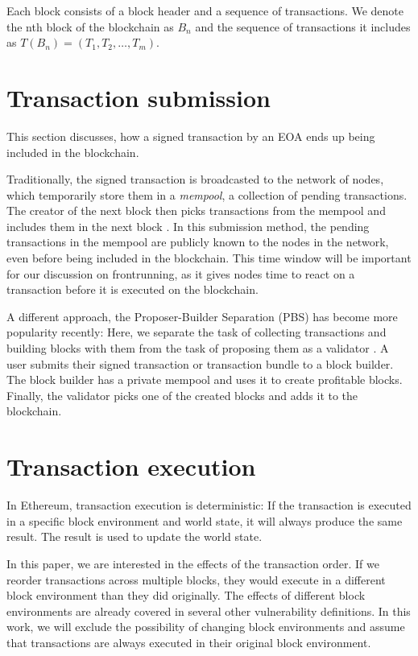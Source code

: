 \documentclass[draft,final]{vutinfth} %
\begin{document}
Each block consists of a block header and a sequence of transactions. We denote the nth block of the blockchain as $B_n$ and the sequence of transactions it includes as $T(B_n) = (T_1, T_2, \dots, T_m)$.

\section{Transaction submission}

This section discusses, how a signed transaction by an EOA ends up being included in the blockchain.

Traditionally, the signed transaction is broadcasted to the network of nodes, which temporarily store them in a \emph{mempool}, a collection of pending transactions. The creator of the next block then picks transactions from the mempool and includes them in the next block \cite{eskandari_sok_2020}. In this submission method, the pending transactions in the mempool are publicly known to the nodes in the network, even before being included in the blockchain. This time window will be important for our discussion on frontrunning, as it gives nodes time to react on a transaction before it is executed on the blockchain.

A different approach, the Proposer-Builder Separation (PBS) has become more popularity recently: Here, we separate the task of collecting transactions and building blocks with them from the task of proposing them as a validator \cite{heimbach_ethereums_2023}. A user submits their signed transaction or transaction bundle to a block builder. The block builder has a private mempool and uses it to create profitable blocks. Finally, the validator picks one of the created blocks and adds it to the blockchain.

\section{Transaction execution}

In Ethereum, transaction execution is deterministic: If the transaction is executed in a specific block environment and world state, it will always produce the same result. The result is used to update the world state.

In this paper, we are interested in the effects of the transaction order. If we reorder transactions across multiple blocks, they would execute in a different block environment than they did originally. The effects of different block environments are already covered in several other vulnerability definitions. In this work, we will exclude the possibility of changing block environments and assume that transactions are always executed in their original block environment.
\end{document}
